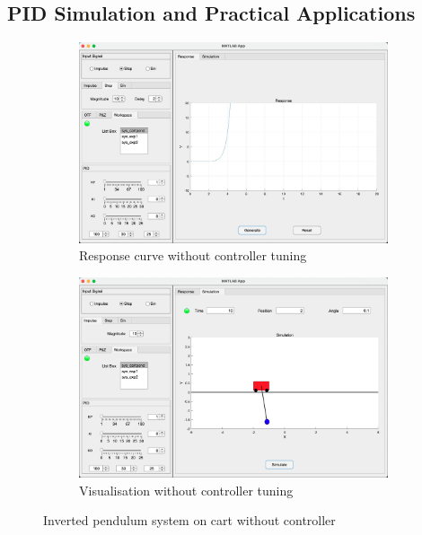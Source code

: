\documentclass[journal,twoside,web]{ieeecolor}
\begin{document}
\subsection{PID Simulation and Practical Applications}

\begin{figure}[!ht]
    \centering
    \begin{subfigure}[b]{0.5\textwidth}
        \centering
        \includegraphics[width=\textwidth]{Images/nopid.jpg}
        \caption{Response curve without controller tuning}
        \label{fig:nopid}
    \end{subfigure}%
    \hfill %
    \begin{subfigure}[b]{0.5\textwidth}
        \centering
        \includegraphics[width=\textwidth]{Images/Unsta.jpg}
        \caption{Visualisation without controller tuning}
        \label{fig:Unsta}
    \end{subfigure}
    \caption{Inverted pendulum system on cart without controller}
    \label{fig:side_by_side}
\end{figure}
\end{document}
